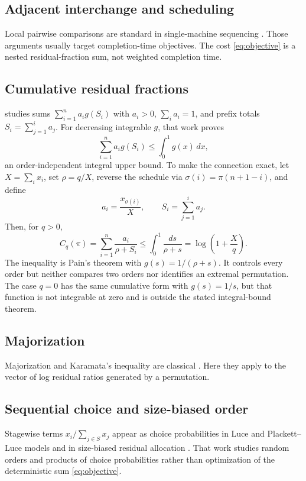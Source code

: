 \documentclass[pdflatex,iicol,sn-basic]{sn-jnl}
\theoremstyle{thmstyleone}
\theoremstyle{thmstyletwo}
\theoremstyle{thmstylethree}
\begin{document}
\subsection{Adjacent interchange and scheduling}
Local pairwise comparisons are standard in single-machine sequencing
\citep{Smith1956,Sidney1975,Lawler1978,CorreaSchulz2005,JagerWarode2024}. Those
arguments usually target completion-time objectives. The cost
\eqref{eq:objective} is a nested residual-fraction sum, not weighted completion
time.

\subsection{Cumulative residual fractions}
\citet{Pain2026} studies sums \(\sum_{i=1}^n a_i g(S_i)\) with \(a_i>0\),
\(\sum_i a_i=1\), and prefix totals \(S_i=\sum_{j=1}^i a_j\). For decreasing
integrable \(g\), that work proves
\[
\sum_{i=1}^n a_i g(S_i)\le\int_0^1 g(x)\,dx,
\]
an order-independent integral upper bound. To make the connection exact, let
\(X=\sum_i x_i\), set \(\rho=q/X\), reverse the schedule via
\(\sigma(i)=\pi(n+1-i)\), and define
\[
a_i=\frac{x_{\sigma(i)}}{X},
\qquad
S_i=\sum_{j=1}^i a_j.
\]
Then, for \(q>0\),
\begin{equation}\label{eq:pain}
C_q(\pi)
=
\sum_{i=1}^n \frac{a_i}{\rho+S_i}
\le
\int_0^1\frac{ds}{\rho+s}
=
\log\left(1+\frac{X}{q}\right).
\end{equation}
The inequality is Pain's theorem with \(g(s)=1/(\rho+s)\). It controls every
order but neither compares two orders nor identifies an extremal permutation.
The case \(q=0\) has the same cumulative form with \(g(s)=1/s\), but that
function is not integrable at zero and is outside the stated integral-bound
theorem.

\subsection{Majorization}
Majorization and Karamata's inequality are classical
\citep{HardyLittlewoodPolya1952,MarshallOlkinArnold2011,Arnold2008}. Here they
apply to the vector of log residual ratios generated by a permutation.

\subsection{Sequential choice and size-biased order}
Stagewise terms \(x_i/\sum_{j\in S}x_j\) appear as choice probabilities in Luce
and Plackett--Luce models and in size-biased residual allocation
\citep{Luce1959,Plackett1975,PermanPitmanYor1992,PitmanTran2015}. That work
studies random orders and products of choice probabilities rather than
optimization of the deterministic sum \eqref{eq:objective}.
\end{document}
